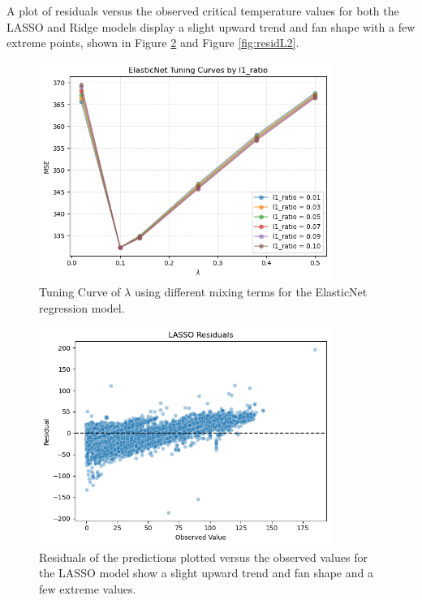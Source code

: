 \documentclass{article}      %
\begin{document}
A plot of residuals versus the observed critical temperature values for both the LASSO and Ridge models display a slight upward trend and fan shape with a few extreme points, shown in Figure \ref{fig:residL1} and Figure \ref{fig:residL2}.

\begin{figure}[h]
	\centering
	\includegraphics[width=0.85\textwidth]{figures/plt_tuning_EN_narrowLine.png}
	\caption{Tuning Curve of  \(\lambda \) using different mixing terms for the ElasticNet regression model.}
	\label{fig:tuning_EN}
\end{figure}

\begin{figure}[h]
        \centering
        \includegraphics[width=0.85\textwidth]{figures/plt_residuals_L1.png}
        \caption{Residuals of the predictions plotted versus the observed values for the LASSO model show a slight upward trend and fan shape and a few extreme values.}
\label{fig:residL1}
\end{figure}
\end{document}
